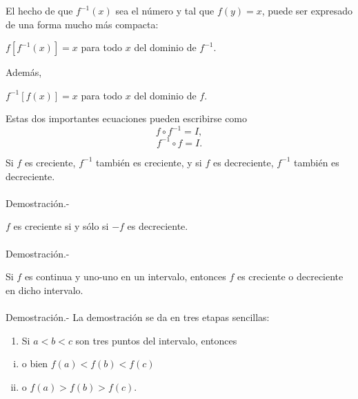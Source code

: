 El hecho de que $f^{-1}(x)$ sea el número y tal que $f(y)=x$, puede ser expresado de una forma mucho más compacta:
\begin{center}
    $f\left[f^{-1}(x)\right]=x$ para todo $x$ del dominio de $f^{-1}$.
\end{center}

Además,
\begin{center}
    $f^{-1}\left[f(x)\right]=x$ para todo $x$ del dominio de $f$.
\end{center}

Estas dos importantes ecuaciones pueden escribirse como
$$f\circ f^{-1}=I,$$
$$f^{-1}\circ f=I.$$

\begin{lema}
    Si $f$ es creciente, $f^{-1}$ también es creciente, y si $f$ es decreciente, $f^{-1}$ también es decreciente.\\\\
	Demostración.-\; 
\end{lema}

\begin{lema}
    $f$ es creciente si y sólo si $-f$ es decreciente.\\\\
	Demostración.-\; 
\end{lema}

\begin{teo}
    Si $f$ es continua y uno-uno en un intervalo, entonces $f$ es creciente o decreciente en dicho intervalo.\\\\
	Demostración.-\; La demostración se da en tres etapas sencillas:
	\begin{enumerate}[(1)]
	    \item Si $a<b<c$ son tres puntos del intervalo, entonces
	\end{enumerate}
	\begin{enumerate}[(i)]
	    \item o bien $f(a)<f(b)<f(c)$
	    \item o $f(a)>f(b)>f(c)$.
	\end{enumerate}
\end{teo}

